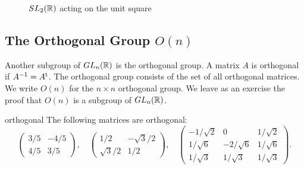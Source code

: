  
\begin{figure}[htb] %

\begin{center}
\end{center}

\caption{$SL_2({\Bbb R})$ acting on the unit square}
\label{SL2}
\end{figure}


 
\subsection*{The Orthogonal Group $O(n)$}
 
 
 
Another subgroup of $GL_n({\Bbb R})$ is the orthogonal group. A matrix
$A$ is {\bfi
orthogonal\/} if
$A^{-1} = A^{\rm t}$. The {\bfi orthogonal
group\/} consists of
the set of all orthogonal matrices. We write
$O(n)$\label{noteorthogonal} for the $n \times n$ orthogonal group. We
leave as an exercise the proof that $O(n)$ is a subgroup of $GL_n(
{\Bbb R})$.
 
 
\begin{example}{orthogonal}
The following matrices are orthogonal:
\[
\begin{pmatrix}
3/5 & -4/5 \\
4/5 & 3/5
\end{pmatrix}, 
\quad
\begin{pmatrix}
1/2 & -\sqrt{3}/2 \\
\sqrt{3}/2 & 1/2
\end{pmatrix}, 
\quad
\begin{pmatrix}
-1/\sqrt{2} & 0 & 1/ \sqrt{2} \\
1/\sqrt{6} & -2/\sqrt{6} & 1/\sqrt{6} \\
1/ \sqrt{3} & 1/ \sqrt{3} & 1/ \sqrt{3} 
\end{pmatrix}.
\]
\end{example}


